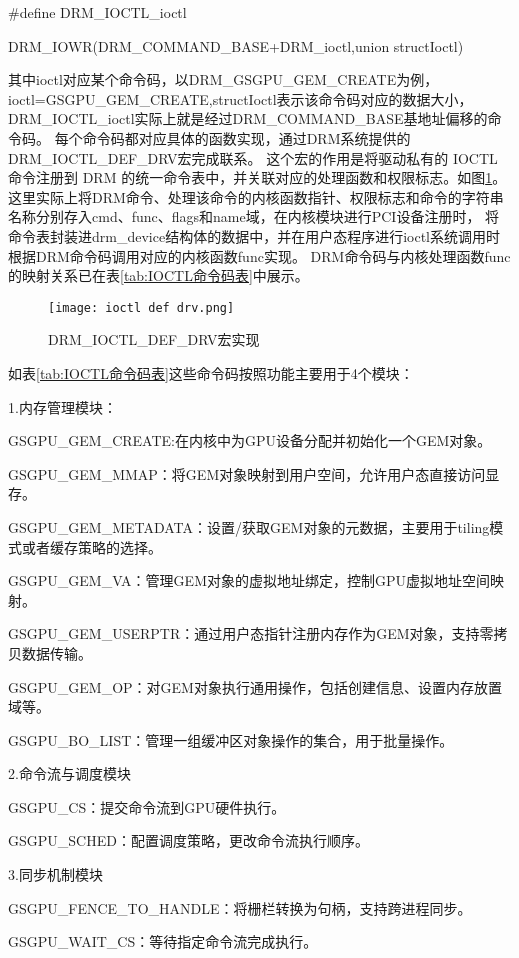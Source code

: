 \#define DRM\_IOCTL\_ioctl

 DRM\_IOWR(DRM\_COMMAND\_BASE+DRM\_ioctl,union structIoctl)

其中ioctl对应某个命令码，以DRM\_GSGPU\_GEM\_CREATE为例，ioctl=GSGPU\_GEM\_CREATE,structIoctl表示该命令码对应的数据大小，
DRM\_IOCTL\_ioctl实际上就是经过DRM\_COMMAND\_BASE基地址偏移的命令码。
每个命令码都对应具体的函数实现，通过DRM系统提供的DRM\_IOCTL\_DEF\_DRV宏完成联系。
这个宏的作用是将驱动私有的 IOCTL 命令注册到 DRM 的统一命令表中，并关联对应的处理函数和权限标志。如图\ref{fig:ioctl def drv}。
这里实际上将DRM命令、处理该命令的内核函数指针、权限标志和命令的字符串名称分别存入cmd、func、flags和name域，在内核模块进行PCI设备注册时，
将命令表封装进drm\_device结构体的数据中，并在用户态程序进行ioctl系统调用时根据DRM命令码调用对应的内核函数func实现。
DRM命令码与内核处理函数func的映射关系已在表\ref{tab:IOCTL命令码表}中展示。

\begin{figure}[h]
  \centering
  \texttt{[image: ioctl def drv.png]}
  \caption{DRM\_IOCTL\_DEF\_DRV宏实现}
  \label{fig:ioctl def drv}
\end{figure}

如表\ref{tab:IOCTL命令码表}这些命令码按照功能主要用于4个模块：

1.内存管理模块：

GSGPU\_GEM\_CREATE:在内核中为GPU设备分配并初始化一个GEM对象。

GSGPU\_GEM\_MMAP：将GEM对象映射到用户空间，允许用户态直接访问显存。

GSGPU\_GEM\_METADATA：设置/获取GEM对象的元数据，主要用于tiling模式或者缓存策略的选择。

GSGPU\_GEM\_VA：管理GEM对象的虚拟地址绑定，控制GPU虚拟地址空间映射。

GSGPU\_GEM\_USERPTR：通过用户态指针注册内存作为GEM对象，支持零拷贝数据传输。

GSGPU\_GEM\_OP：对GEM对象执行通用操作，包括创建信息、设置内存放置域等。

GSGPU\_BO\_LIST：管理一组缓冲区对象操作的集合，用于批量操作。

2.命令流与调度模块

GSGPU\_CS：提交命令流到GPU硬件执行。

GSGPU\_SCHED：配置调度策略，更改命令流执行顺序。

3.同步机制模块

GSGPU\_FENCE\_TO\_HANDLE：将栅栏转换为句柄，支持跨进程同步。

GSGPU\_WAIT\_CS：等待指定命令流完成执行。

